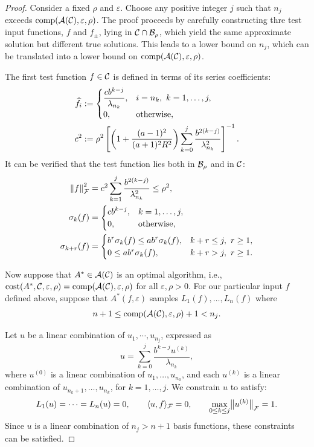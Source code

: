 \documentclass[final]{elsarticle}
\theoremstyle{definition}
\theoremstyle{remark}
\begin{document}
\begin{proof}
Consider a fixed $\rho$ and $\varepsilon$.  Choose any positive integer $j$ such that $n_j$ exceeds $\comp(\ca(\cc),\varepsilon,\rho)$.  The proof proceeds by carefully constructing thre  test input functions, $f$ and $f_{\pm}$, lying in $\cc \cap \cb_{\rho}$, which yield the same approximate solution but different true solutions.  This leads to a lower bound on $n_j$, which can be translated into a lower bound on $\comp(\ca(\cc),\varepsilon,\rho)$. 

The first test function $f \in \cc$ is defined in terms of its series coefficients:
\begin{align}
\nonumber
\hf_i &:= \begin{cases}
\displaystyle
\frac{c b^{k-j}}{\lambda_{n_{k}}},  & i =  n_{k}, \ k = 1, \ldots, j,
\\
0, & \text{otherwise},
\end{cases}
\\
\label{cdef}
c^2 &:=  \rho^2 \left[ \left(1+\frac{(a-1)^2}{(a+1)^{2} R^2 }\right)\sum_{k=0}^j \frac{b^{2(k-j)}}{\lambda_{n_{k}}^2}\right]^{-1}.
\end{align}
It can be verified that the test function lies both in $\cb_{\rho}$ and in $\cc$:
\begin{align}
\label{testfunnorm}
\norm[\cf]{f}^2 &=  c^2\sum_{k=1}^j \frac{ b^{2(k-j)}}{\lambda^2_{n_{k}}} \le \rho^2,
\\
\nonumber
\sigma_k(f) &= \begin{cases}
\displaystyle
c b^{k-j}, & k =1, \ldots, j, \\
0, & \text{otherwise},
\end{cases}
\\
\nonumber
\sigma_{k+r}(f) &= \begin{cases}
\displaystyle 
b^{r} \sigma_k(f) \le a b^r \sigma_k(f), & k+r \le j, \ r \ge 1,
\\
0 \le a b^r \sigma_k(f), & k+r > j, \ r \ge 1.
\end{cases}
\end{align}

Now suppose that $A^* \in \ca(\cc)$ is an optimal algorithm, i.e., $\cost(A^*,\cc,\varepsilon,\rho) =  \comp(\ca(\cc),\varepsilon,\rho)$ for all $\varepsilon, \rho > 0$.  For our particular input $f$ defined above, suppose that $A^*(f,\varepsilon)$ samples $L_1(f), \ldots, L_n(f)$ where 
\[
n + 1\le \comp(\ca(\cc),\varepsilon,\rho) +1 < n_j.
\]  

Let $u$ be a linear combination of $u_1, \cdots, u_{n_j}$, expressed as
\[
u =  \sum_{k=0}^{j}\frac{b^{k-j}u^{(k)}}{\lambda_{n_k}},
\]
where $u^{(0)}$ is a linear combination of $u_{1}, \ldots, u_{n_0}$, and each $u^{(k)}$ is a linear combination of $u_{n_k+1}, \ldots, u_{n_k}$, for $k =1, \ldots, j$.  We constrain $u$ to satisfy:
\begin{equation}\label{uConstraint}
L_1(u) = \cdots = L_n(u) = 0, \qquad \langle u,f \rangle_{\cf} = 0, \qquad 
\max_{0\le k\le j} \bignorm[\cf]{u^{(k)}} = 1.
\end{equation}
Since $u$ is a linear combination of $n_j >n+1$ basis functions, these constraints can be satisfied.


\end{proof}
\end{document}

